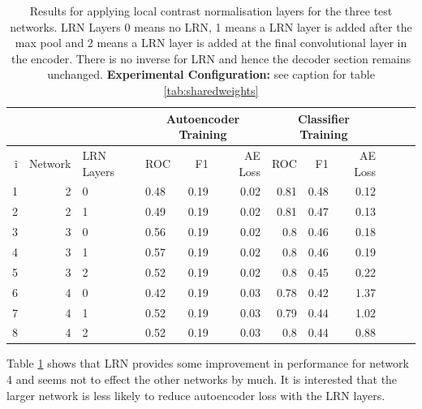           \begin{table}[!h] \centering
            \footnotesize{
            \begin{tabular}{rrllrrrrrrrr}
              &&&   \multicolumn{3}{|c|}{Autoencoder Training} &  \multicolumn{3}{c|}{Classifier Training}    \\
            \hline
              i & Network             & LRN Layers   &    ROC&F1&AE Loss & ROC & F1 & AE Loss \\
            \hline
             1 & 2 & 0  &    0.48 &   0.19 &     0.02 &    0.81 &   0.48 &     0.12 \\
             2 & 2 & 1  &    0.49 &   0.19 &     0.02 &    0.81 &   0.47 &     0.13 \\
            \hline
             3 & 3 & 0  &    0.56 &   0.19 &     0.02 &    0.8  &   0.46 &     0.18 \\
             4 & 3 & 1  &    0.57 &   0.19 &     0.02 &    0.8  &   0.46 &     0.19 \\
             5 & 3 & 2  &    0.52 &   0.19 &     0.02 &    0.8  &   0.45 &     0.22 \\
            \hline
             6 & 4 & 0  &    0.42 &   0.19 &     0.03 &    0.78 &   0.42 &     1.37 \\
             7 & 4 & 1  &    0.52 &   0.19 &     0.03 &    0.79 &   0.44 &     1.02 \\
             8 & 4 & 2  &    0.52 &   0.19 &     0.03 &    0.8  &   0.44 &     0.88 \\
            \hline
            \end{tabular}}

            \caption{Results for applying local contrast normalisation layers
            for the three test networks. LRN Layers 0 means no LRN, 1 means a LRN layer is added after the max pool
            and 2 means a LRN layer is added at the final convolutional layer in the encoder. There is no
            inverse for LRN and hence the decoder section remains unchanged. {\bf Experimental Configuration:} see caption
            for table \ref{tab:sharedweights}
            }
            \label{tab:lrn}
          \end{table}

          Table \ref{tab:lrn} shows that LRN provides some improvement in performance for network 4 and seems
          not to effect the other networks by much. It is interested that the larger network
          is less likely to reduce autoencoder loss with the LRN layers.

